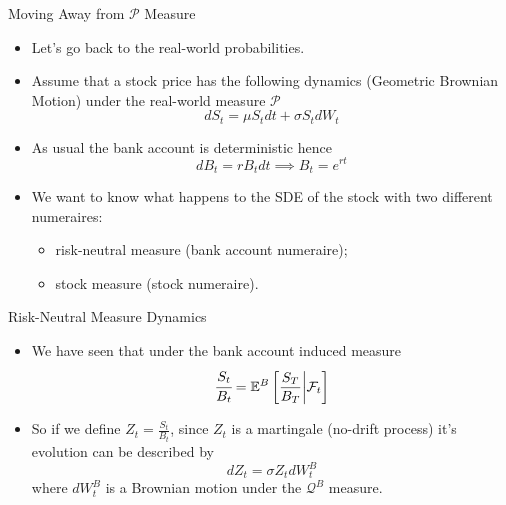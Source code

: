 \documentclass{beamer}
\begin{document}
\begin{frame}{Moving Away from $\mathcal{P}$ Measure}
  \begin{itemize}
  \item Let's go back to the real-world probabilities.
  \item Assume that a stock price has the following dynamics (Geometric Brownian Motion) under the real-world measure $\mathcal{P}$
    \begin{equation*}
      dS_t = \mu S_t dt + \sigma S_t dW_t
    \end{equation*}
  \item As usual the bank account is deterministic hence
    \begin{equation*}
      dB_t = rB_tdt\implies B_t = e^{rt}
    \end{equation*}
	\pause
  \item We want to know what happens to the SDE of the stock with two different numeraires:
    \begin{itemize}
    \item risk-neutral measure (bank account numeraire);
    \item stock measure (stock numeraire).
    \end{itemize}
  \end{itemize}
\end{frame}

\begin{frame}{Risk-Neutral Measure Dynamics}
  \begin{itemize}
  \item We have seen that under the bank account induced measure 
    \begin{equation*}
      \cfrac{S_t}{B_t} = \mathbb{E}^B\left[\frac{S_T}{B_T}\bigg|\mathcal{F}_t\right]
    \end{equation*}
  \item So if we define $Z_t=\frac{S_t}{B_t}$, since $Z_t$ is a martingale (no-drift process) it's evolution can be described by
    \begin{equation}
      dZ_t = \sigma Z_t dW_t^B
      \label{eq:z_martingale1}
    \end{equation}
    where $dW_t^B$ is a Brownian motion under the $\mathcal{Q}^B$ measure.
  \end{itemize}
\end{frame}
\end{document}
